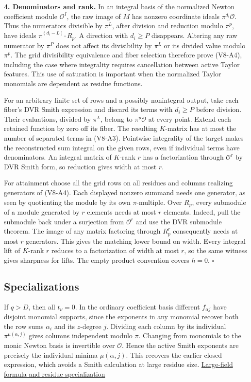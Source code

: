\documentclass[
  11pt,
]{article}
\begin{document}
\textbf{4. Denominators and rank.} In an integral basis of the
normalized Newton coefficient module \(\mathcal O^I\), the raw image of
\(M\) has nonzero coordinate ideals \(\pi^{d_i}\mathcal O\). Thus the
numerators divisible by \(\pi^L\), after division and reduction modulo
\(\pi^p\), have ideals \(\pi^{(d_i-L)_+}R_p\). A direction with
\(d_i\ge P\) disappears. Altering any raw numerator by \(\pi^P\) does
not affect its divisibility by \(\pi^L\) or its divided value modulo
\(\pi^p\). The grid divisibility equivalence and fiber selection
therefore prove (V8-A4), including the case where integrality requires
cancellation between active Taylor features. This use of saturation is
important when the normalized Taylor monomials are dependent as residue
functions.

For an arbitrary finite set of rows and a possibly nonintegral output,
take each fiber's DVR Smith expression and discard its terms with
\(d_i\ge P\) before division. Their evaluations, divided by \(\pi^L\),
belong to \(\pi^p\mathcal O\) at every point. Extend each retained
function by zero off its fiber. The resulting \(K\)-matrix has at most
the number of separated terms in (V8-A3). Pointwise integrality of the
target makes the reconstructed sum integral on the given rows, even if
individual terms have denominators. An integral matrix of \(K\)-rank
\(r\) has a factorization through \(\mathcal O^r\) by DVR Smith form, so
reduction gives width at most \(r\).

For attainment choose all the grid rows on all residues and columns
realizing generators of (V8-A4). Each displayed nonzero summand needs one
generator, as seen by quotienting the module by its own
\(\pi\)-multiple. Over \(R_p\), every submodule of a module generated by
\(r\) elements needs at most \(r\) elements. Indeed, pull the submodule
back under a surjection from \(\mathcal O^r\) and use the DVR submodule
theorem. The image of any matrix factoring through \(R_p^r\)
consequently needs at most \(r\) generators. This gives the matching
lower bound on width. Every integral lift of \(K\)-rank \(r\) reduces to
a factorization of width at most \(r\), so the same witness gives
sharpness for lifts. The empty product convention covers \(h=0\).
\(\square\)

\subsection{Specializations}\label{v8-specializations}

If \(q>D\), then all \(t_\nu=0\). In the ordinary coefficient basis
different \(f_{\alpha j}\) have disjoint monomial supports, since the
exponents in any monomial recover both the row sums \(\alpha_i\) and its
\(z\)-degree \(j\). Dividing each column by its individual
\(\pi^{\mu(\alpha,j)}\) gives columns independent modulo \(\pi\).
Changing from monomials to the monic Newton basis is invertible over
\(\mathcal O\). Hence the active Smith exponents are precisely the
individual minima \(\mu(\alpha,j)\). This recovers the earlier closed
expression, which avoids a Smith calculation at large residue size.
\hyperref[v8-section-jet-polynomial-capacity]{Large-field formula and
residue specialization}
\end{document}
